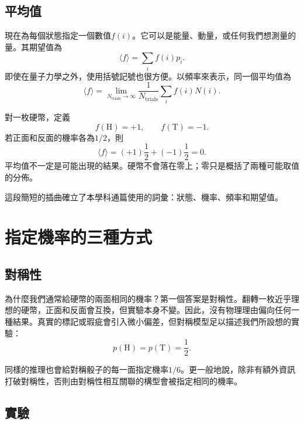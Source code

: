 \subsection{平均值}

現在為每個狀態指定一個數值\(f(i)\)。它可以是能量、動量，或任何我們想測量的量。其期望值為
\begin{equation}
 \langle f\rangle=\sum_i f(i)p_i.
 \label{eq:sm1-expectation}
\end{equation}
即使在量子力學之外，使用括號記號也很方便。以頻率來表示，同一個平均值為
\begin{equation}
 \langle f\rangle
 =
 \lim_{N_{\mathrm{trials}}\to\infty}
 \frac{1}{N_{\mathrm{trials}}}
 \sum_i f(i)N(i).
 \label{eq:sm1-frequency-average}
\end{equation}

對一枚硬幣，定義
\begin{equation}
 f(\mathrm{H})=+1,
 \qquad
 f(\mathrm{T})=-1.
\end{equation}
若正面和反面的機率各為\(1/2\)，則
\begin{equation}
 \langle f\rangle
 =(+1)\frac12+(-1)\frac12=0.
\end{equation}
平均值不一定是可能出現的結果。硬幣不會落在零上；零只是概括了兩種可能取值的分佈。

這段簡短的插曲確立了本學科通篇使用的詞彙：狀態、機率、頻率和期望值。

\section{指定機率的三種方式}

\subsection{對稱性}

為什麼我們通常給硬幣的兩面相同的機率？第一個答案是對稱性。翻轉一枚近乎理想的硬幣，正面和反面會互換，但實驗本身不變。因此，沒有物理理由偏向任何一種結果。真實的標記或瑕疵會引入微小偏差，但對稱模型足以描述我們所設想的實驗：
\begin{equation}
 p(\mathrm{H})=p(\mathrm{T})=\frac12.
\end{equation}

同樣的推理也會給對稱骰子的每一面指定機率\(1/6\)。更一般地說，除非有額外資訊打破對稱性，否則由對稱性相互關聯的構型會被指定相同的機率。

\subsection{實驗}

